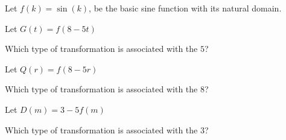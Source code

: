 \documentclass{ximera}
\author{Lee Wayand}
\begin{document}
\begin{exercise}




Let $f(k) = \sin(k)$, be the basic sine function with its natural domain. \\


\begin{question}


Let $G(t) = f(8 - 5 t)$


Which type of transformation is associated with the $5$?


\begin{multipleChoice}
\end{multipleChoice}


\end{question}








\begin{question}


Let $Q(r) = f(8 - 5 r)$


Which type of transformation is associated with the $8$?


\begin{multipleChoice}
\end{multipleChoice}


\end{question}






\begin{question}


Let $D(m) = 3 - 5 f(m)$


Which type of transformation is associated with the $3$?


\begin{multipleChoice}
\end{multipleChoice}


\end{question}












\end{exercise}
\end{document}

